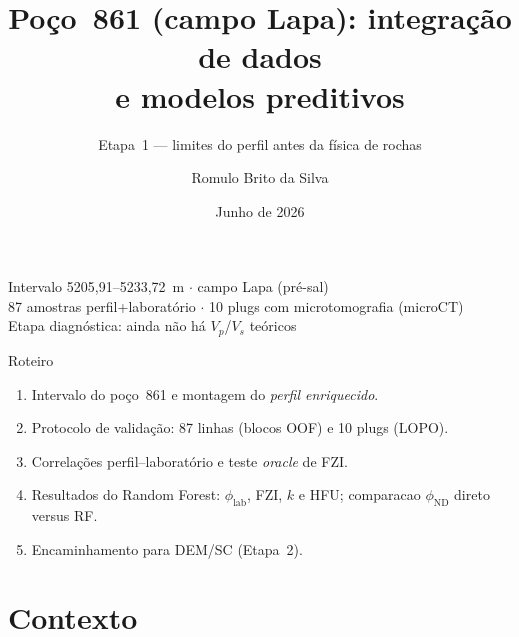 \documentclass[aspectratio=169,10pt]{beamer}
\title{Poço~861 (campo Lapa): integração de dados\\e modelos preditivos}
\subtitle{Etapa~1 --- limites do perfil antes da física de rochas}
\author{Romulo Brito da Silva}
\institute{UENF / LENEP}
\date{Junho de 2026}
\newcommand{\philab}{\ensuremath{\phi_{\mathrm{lab}}}}
\newcommand{\phiND}{\ensuremath{\phi_{\mathrm{ND}}}}
\begin{document}
\begin{frame}[plain]
  \titlepage
  \vspace{0.25cm}
  \begin{center}
    \footnotesize
    Intervalo 5205,91--5233,72~m $\cdot$ campo Lapa (pré-sal)\\
    87 amostras perfil+laboratório $\cdot$ 10 plugs com microtomografia (microCT)\\[0.12cm]
    Etapa diagnóstica: ainda não há $V_p$/$V_s$ teóricos
  \end{center}
\end{frame}

\begin{frame}{Roteiro}
  \footnotesize
  \begin{enumerate}
    \item Intervalo do poço~861 e montagem do \emph{perfil enriquecido}.
    \item Protocolo de validação: 87 linhas (blocos OOF) e 10 plugs (LOPO).
    \item Correlações perfil--laboratório e teste \emph{oracle} de FZI.
    \item Resultados do Random Forest: \philab, FZI, $k$ e HFU; comparacao
          \phiND{} direto versus RF.
    \item Encaminhamento para DEM/SC (Etapa~2).
  \end{enumerate}
\end{frame}

\section{Contexto}
\end{document}
